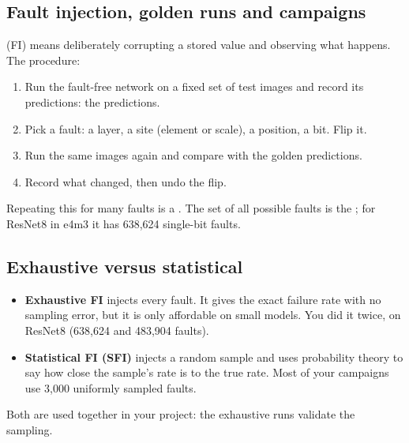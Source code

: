 \subsection{Fault injection, golden runs and campaigns}
 (FI) means deliberately corrupting a stored value and observing what happens. The procedure:
\begin{enumerate}
\item Run the fault-free network on a fixed set of test images and record its predictions: the  predictions.
\item Pick a fault: a layer, a site (element or scale), a position, a bit. Flip it.
\item Run the same images again and compare with the golden predictions.
\item Record what changed, then undo the flip.
\end{enumerate}
Repeating this for many faults is a . The set of all possible faults is the ; for ResNet8
in e4m3 it has 638{,}624 single-bit faults.

\subsection{Exhaustive versus statistical}
\begin{itemize}
\item \textbf{Exhaustive FI} injects every fault. It gives the exact failure rate with no sampling error, but it is only affordable on small
 models. You did it twice, on ResNet8 (638{,}624 and 483{,}904 faults).
\item \textbf{Statistical FI (SFI)} injects a random sample and uses probability theory to say how close the sample's rate is to
 the true rate. Most of your campaigns use 3{,}000 uniformly sampled faults.
\end{itemize}
Both are used together in your project: the exhaustive runs validate the sampling.

